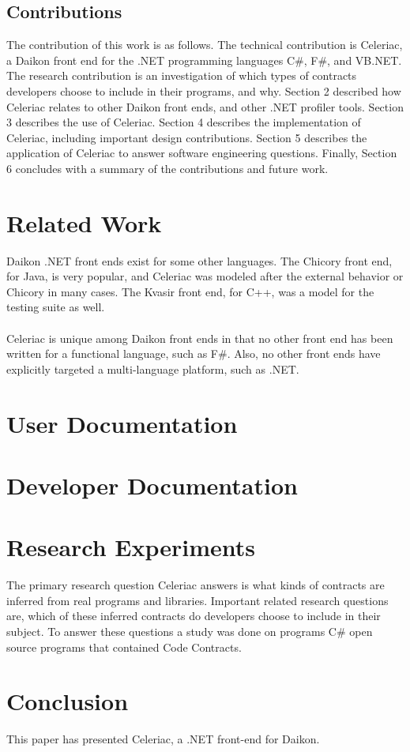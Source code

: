 \documentclass{article}
\begin{document}
\subsection{Contributions}
The contribution of this work is as follows. The technical contribution is Celeriac, a Daikon front end for the .NET programming languages C\#, F\#, and VB.NET. The research contribution is an investigation of which types of contracts developers choose to include in their programs, and why. Section 2 described how Celeriac relates to other Daikon front ends, and other .NET profiler tools. Section 3 describes the use of Celeriac. Section 4 describes the implementation of Celeriac, including important design contributions. Section 5 describes the application of Celeriac to answer software engineering questions. Finally, Section 6 concludes with a summary of the contributions and future work.

\section{Related Work}
Daikon .NET front ends exist for some other languages. The Chicory front end, for Java, is very popular, and Celeriac was modeled after the external behavior or Chicory in many cases. The Kvasir front end, for C++, was a model for the testing suite as well.
\\ \\
Celeriac is unique among Daikon front ends in that no other front end has been written for a functional language, such as F\#. Also, no other front ends have explicitly targeted a multi-language platform, such as .NET.

\section{User Documentation}

\section{Developer Documentation}

\section{Research Experiments}
The primary research question Celeriac answers is what kinds of contracts are inferred from real programs and libraries. Important related research questions are, which of these inferred contracts do developers choose to include in their subject. To answer these questions a study was done on programs C\# open source programs that contained Code Contracts.




\section{Conclusion}
This paper has presented Celeriac, a .NET front-end for Daikon.

\newpage


\end{document}
